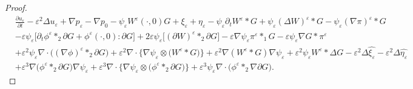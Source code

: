 \documentclass[13pt,CJK]{article}
\theoremstyle{plain}                       %
\theoremstyle{remark}
\numberwithin{equation}{section}
\begin{document}
\begin{proof}
\begin{equation*}
\begin{aligned}
&\frac{\partial u_{\varepsilon}}{\partial t}
-\varepsilon^2\Delta u_{\varepsilon}+\nabla p_{\varepsilon}
-\nabla p_0-\psi_{\varepsilon}W^{\varepsilon}(\cdot,0)G+\xi_{\varepsilon}+\eta_{\varepsilon}
-\psi_{\varepsilon}\partial_tW^{\varepsilon}\ast G
+\psi_{\varepsilon}(\Delta W)^{\varepsilon}\ast G-\psi_{\varepsilon}(\nabla\pi)^{\varepsilon}\ast G\\
&-\varepsilon\psi_{\varepsilon}
\bigg[
\partial_t\phi^{\varepsilon}
\ast_2\partial G+\phi^{\varepsilon}(\cdot,0):\partial G
\bigg]
+2\varepsilon\psi_{\varepsilon}\big[(\partial W)^{\varepsilon}\ast_2\partial G\big]
-\varepsilon
\nabla\psi_{\varepsilon}
\pi^{\varepsilon}\ast_1 G
-\varepsilon\psi_{\varepsilon}\nabla G\ast\pi^{\varepsilon}\\
&+\varepsilon^2\psi_{\varepsilon}
\nabla\cdot
\Big(
(\nabla\phi)^{\varepsilon}\ast_2\partial G
\Big)
+\varepsilon^2\nabla\cdot
\bigg\{
\nabla\psi_{\varepsilon}\otimes \big(W^{\varepsilon}\ast G\big)
\bigg\}
+\varepsilon^2\nabla(W^{\varepsilon}\ast G)\nabla
\psi_{\varepsilon}
+\varepsilon^2
\psi_{\varepsilon}W^{\varepsilon}\ast\Delta G
-\varepsilon^2
\Delta\hat{\xi_{\varepsilon}}-\varepsilon^2\Delta\hat{\eta_{\varepsilon}}\\
&+\varepsilon^3\nabla
\big(\phi^{\varepsilon}\ast_2\partial G\big)\nabla\psi_{\varepsilon}+
\varepsilon^3\nabla\cdot\bigg\{
\nabla\psi_{\varepsilon}\otimes
\big(\phi^{\varepsilon}\ast_2\partial G\big)
\bigg\}
+\varepsilon^3\psi_{\varepsilon}
\nabla\cdot\Big(\phi^{\varepsilon}\ast_2\nabla\partial G\Big).
\end{aligned}
\end{equation*}


\end{proof}
\end{document}
